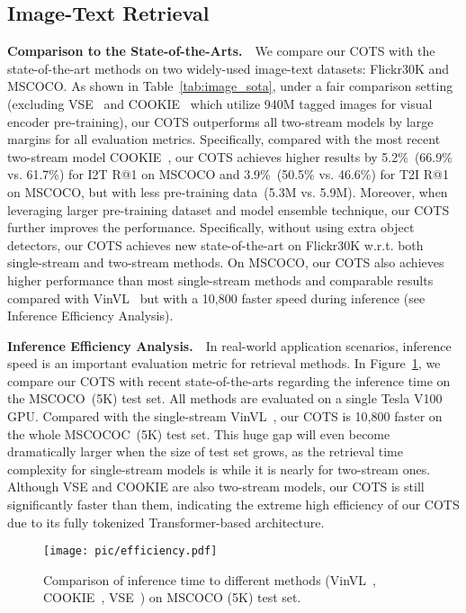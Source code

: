 \documentclass[10pt,twocolumn,letterpaper]{article}
\begin{document}
\vspace{-0.1cm}
\subsection{Image-Text Retrieval}
\label{sec:main_results}
\vspace{-0.1cm}

\noindent\textbf{Comparison to the State-of-the-Arts.}~~We compare our COTS with the state-of-the-art methods on two widely-used image-text datasets: Flickr30K and MSCOCO. As shown in Table~\ref{tab:image_sota}, under a fair comparison setting (excluding VSE~\cite{chen2021learning} and COOKIE~\cite{wen2021cookie} which utilize 940M tagged images for visual encoder pre-training), our COTS outperforms all two-stream models by large margins for all evaluation metrics. Specifically, compared with the most recent two-stream model COOKIE~\cite{wen2021cookie}, our COTS achieves higher results by 5.2\%~(66.9\% vs. 61.7\%) for I2T R@1 on MSCOCO and 3.9\%~(50.5\% vs. 46.6\%) for T2I R@1 on MSCOCO, but with less pre-training data~(5.3M vs. 5.9M).
Moreover, when leveraging larger pre-training dataset and model ensemble technique, our COTS further improves the performance. Specifically, without using extra object detectors, our COTS achieves new state-of-the-art on Flickr30K w.r.t. both single-stream and two-stream methods. On MSCOCO, our COTS also achieves higher performance than most single-stream methods and comparable results compared with VinVL~\cite{zhang2021vinvl} but with a 10,800 faster speed during inference (see Inference Efficiency Analysis).

\noindent\textbf{Inference Efficiency Analysis.}~~In real-world application scenarios, inference speed is an important evaluation metric for retrieval methods. In Figure~\ref{fig:efficiency}, we compare our COTS with recent state-of-the-arts regarding the inference time on the MSCOCO~(5K) test set. 
All methods are evaluated on a single Tesla V100 GPU. 
Compared with the single-stream VinVL~\cite{zhang2021vinvl}, our COTS is 10,800 faster on the whole MSCOCOC~(5K) test set. This huge gap will even become dramatically larger when the size of test set  grows, as the retrieval time complexity for single-stream models is  while it is nearly  for two-stream ones. Although VSE and COOKIE are also two-stream models, our COTS is still significantly faster than them, indicating the extreme high efficiency of our COTS due to its fully tokenized Transformer-based architecture.


\begin{figure}[t]
    \centering
    \texttt{[image: pic/efficiency.pdf]}
    \vspace{-0.11in}
    \caption{
    Comparison of inference time to different methods (VinVL~\cite{zhang2021vinvl}, COOKIE~\cite{wen2021cookie}, VSE~\cite{chen2021learning}) on MSCOCO (5K) test set.
    }
    \label{fig:efficiency}
    \vspace{-0.09in}
\end{figure}
\end{document}
